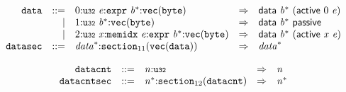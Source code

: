 $$
\begin{array}{@{}l@{}rrlll@{}l@{}}
& {\mathtt{data}} &::=& 0{:}{\mathtt{u{\scriptstyle32}}}~{\mathit{e}}{:}{\mathtt{expr}}~{{\mathit{b}}^\ast}{:}{\mathtt{vec}}({\mathtt{byte}}) &\Rightarrow& \mathsf{data}~{{\mathit{b}}^\ast}~(\mathsf{active}~0~{\mathit{e}}) \\ &&|&
1{:}{\mathtt{u{\scriptstyle32}}}~{{\mathit{b}}^\ast}{:}{\mathtt{vec}}({\mathtt{byte}}) &\Rightarrow& \mathsf{data}~{{\mathit{b}}^\ast}~\mathsf{passive} \\ &&|&
2{:}{\mathtt{u{\scriptstyle32}}}~{\mathit{x}}{:}{\mathtt{memidx}}~{\mathit{e}}{:}{\mathtt{expr}}~{{\mathit{b}}^\ast}{:}{\mathtt{vec}}({\mathtt{byte}}) &\Rightarrow& \mathsf{data}~{{\mathit{b}}^\ast}~(\mathsf{active}~{\mathit{x}}~{\mathit{e}}) \\
& {\mathtt{datasec}} &::=& {{\mathit{data}}^\ast}{:}{{\mathtt{section}}}_{11}({\mathtt{vec}}({\mathtt{data}})) &\Rightarrow& {{\mathit{data}}^\ast} \\
\end{array}
$$

\vspace{1ex}

$$
\begin{array}{@{}l@{}rrlll@{}l@{}}
& {\mathtt{datacnt}} &::=& {\mathit{n}}{:}{\mathtt{u{\scriptstyle32}}} &\Rightarrow& {\mathit{n}} \\
& {\mathtt{datacntsec}} &::=& {{\mathit{n}}^\ast}{:}{{\mathtt{section}}}_{12}({\mathtt{datacnt}}) &\Rightarrow& {{\mathit{n}}^\ast} \\
\end{array}
$$

\vspace{1ex}

